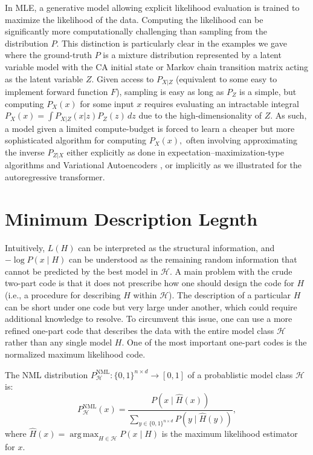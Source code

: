 \documentclass[twoside]{article}
\DeclareMathOperator*{\argmax}{arg\,max}
\begin{document}
In MLE, a generative model allowing explicit likelihood evaluation is trained to maximize the likelihood of the data. Computing the likelihood can be significantly more computationally challenging than sampling from the distribution $P.$ This distinction is particularly clear in the examples we gave where the ground-truth $P$ is a mixture distribution represented by a latent variable model with the CA initial state or Markov chain transition matrix acting as the latent variable $Z$. Given access to $P_{X|Z}$ (equivalent to some easy to implement forward function $F$), sampling is easy as long as $P_Z$ is a simple, but computing $P_X(x)$ for some input $x$ requires evaluating an intractable integral $P_X(x) = \int P_{X|Z}(x|z) P_Z(z) \,dz$ due to the high-dimensionality of $Z.$ As such, a model given a limited compute-budget is forced to learn a cheaper but more sophisticated algorithm for computing $P_X(x),$ often involving approximating the inverse $P_{Z|X}$ either explicitly as done in expectation–maximization-type algorithms and Variational Autoencoders \citep{kingma2013auto}, or implicitly as we illustrated for the autoregressive transformer.


\section{Minimum Description Legnth}
\label{app:mdl}
Intuitively, $L(H)$ can be interpreted as the structural information, and $-\log P(x \mid H)$ can be understood as the remaining random information that cannot be predicted by the best model in $\mathcal H$. 
A main problem with the crude two-part code is that it does not prescribe how one should design the code for $H$ (i.e.,  a procedure for describing $H$ within $\mathcal{H}$).
The description of a particular $H$ can be short under one code but very large under another, which could require additional knowledge to resolve.
To circumvent this issue, one can use a more refined one-part code that describes the data with the entire model class $\mathcal{H}$ rather than any single model $H$. One of the most important one-part codes is the normalized maximum likelihood code.
\begin{definition}
    The NML distribution $P^{\mathrm{NML}}_{\mathcal{H}}: \{0,1\}^{n\times d} \rightarrow [0, 1]$ of a probablistic model class $\mathcal{H}$ is:
    $$P^{\mathrm{NML}}_{\mathcal{H}}(x) = \frac{P(x \mid \widehat{H}(x))}{\sum_{y \in \{0,1\}^{n\times d}} P(y \mid \widehat{H}(y))},$$
    where $\widehat{H}(x) = \argmax_{H \in \mathcal{H}} P(x \mid H)$ is the maximum likelihood estimator for $x$.
\end{definition}
\end{document}
